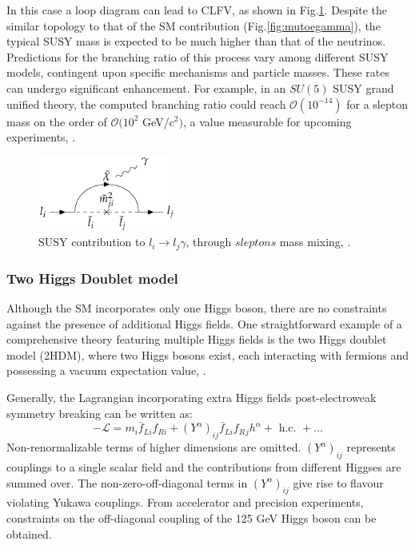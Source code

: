 In this case a loop diagram can lead to CLFV, as shown in Fig.\ref{fig:susy}. 
Despite the similar topology to that of the SM contribution (Fig.\ref{fig:mutoegamma}), 
the typical SUSY mass is expected to be much higher than that of the neutrinos. 
Predictions for the branching ratio of this process vary among different SUSY models, 
contingent upon specific mechanisms and particle masses. These rates can undergo 
significant enhancement. For example, in an $SU(5)$ SUSY grand unified theory, the 
computed branching ratio could reach $\mathcal{O}(10^{-14})$ for a 
slepton mass on the order of $\mathcal{O}(10^{2}$ GeV/c$^2)$, 
a value measurable for upcoming experiments, \cite{clfv_signorelli}.

\begin{figure}[!h]
\centering
\includegraphics[width =0.4\textwidth]{figures/png/Screenshot_20240218_105920.png}
\caption[SUSY contribution to $l_i \rightarrow l_j\gamma$.]{SUSY contribution to $l_i \rightarrow l_j\gamma$, through $sleptons$ mass mixing, \cite{universe8060299}.}
\label{fig:susy}
\end{figure}


\subsubsection{Two Higgs Doublet model}\label{2higgs}
Although the SM incorporates only one Higgs boson, there are 
no constraints against the presence of additional Higgs fields. 
One straightforward example of a comprehensive theory featuring 
multiple Higgs fields is the two Higgs doublet model 
(2HDM), where two Higgs bosons exist, each interacting with 
fermions and possessing a vacuum expectation value, \cite{Harnik_2013}.

Generally, the Lagrangian incorporating extra Higgs fields post-electroweak symmetry breaking can be written as:
\begin{equation}
-\mathscr{L}=m_i \bar{f}_{L i} f_{R i}+\left(Y^\alpha\right)_{i j} \bar{f}_{L i} f_R{ }_j h^\alpha+\text { h.c. }+\ldots
\end{equation}
Non-renormalizable terms of higher dimensions are omitted. $(Y^\alpha)_{i j}$ represents couplings to a single scalar field and the contributions from different Higgses are summed over. The non-zero-off-diagonal terms in $(Y^\alpha)_{i j}$ give rise to flavour violating Yukawa couplings. From accelerator and precision experiments, constraints on the off-diagonal coupling of the 125 GeV Higgs boson can be obtained.
